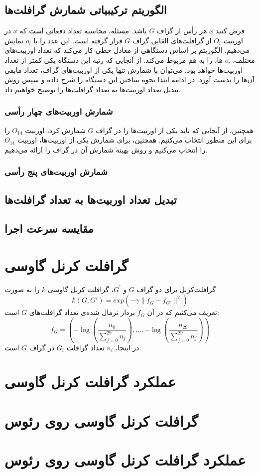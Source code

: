 \subsection{الگوریتم ترکیبیاتی شمارش گرافلت‌ها}
فرض کنید $x$ هر رأس از گراف $G$ باشد. مسئله، محاسبه تعداد دفعاتی است که $x$ در اوربیت $O_i$ از گرافلت‌های القایی گراف $G$ قرار گرفته است. این عدد را با $o_i$ نمایش می‌دهیم. الگوریتم بر اساس دستگاهی از معادل خطی کار می‌کند که تعداد اوربیت‌های مختلف، $o_i$ ها، را به هم مربوط می‌کند. از آنجایی که رتبه این دستگاه یکی کمتر از تعداد اوربیت‌ها خواهد بود، می‌توان با شمارش تنها یکی از اوربیت‌های گراف، تعداد مابقی آن‌ها را بدست آورد. در ادامه ابتدا نحوه ساختن این دستگاه را شرح داده و سپس روش تبدیل تعداد اوربیت‌ها به تعداد گرافلت‌ها را توضیح خواهیم داد.  

\subsubsection{شمارش اوربیت‌های چهار رأسی}
 همچنین، از آنجایی که باید یکی از اوربیت‌ها را در گراف $G$ شمارش کرد، اوربیت $O_14$ را برای این منظور انتخاب می‌کنیم. همچنین، برای شمارش یکی از اوربیت‌ها، اوربیت $O_14$ را انتخاب می‌کنیم و روش بهینه شمارش آن در گراف را ارائه می‌دهیم.

\subsubsection{شمارش اوربیت‌های پنج رأسی}

\subsection{تبدیل تعداد اوربیت‌ها به تعداد گرافلت‌ها}

\subsection{مقایسه سرعت اجرا}

\section{گرافلت کرنل گاوسی}
گرافلت‌کرنل 
برای دو گراف $G$ و $G^\prime$، گرافلت کرنل گاوسی $k$ را به صورت
\begin{equation}
\label{eqn:kernelfunction}
k(G,G') = exp(-\gamma\parallel f_G - f_{G'}\parallel^2)
\end{equation}
تعریف می‌کنیم که در آن $f_G$ بردار نرمال شده‌ی تعداد گرافلت‌های $G$ است:
\begin{equation}
\label{eqn:featurevector}
f_G = (-\log(\dfrac{n_0}{\sum _{j=0}^{29} n_j}),...,-\log(\dfrac{n_{29}}{\sum _{j=0}^{29} n_j}))
\end{equation}
در اینجا، $n_i$ تعداد گرافلت $G_i$ در گراف $G$ است.

\section{عملکرد گرافلت کرنل گاوسی}
\section{گرافلت کرنل گاوسی روی رئوس}
\section{عملکرد گرافلت کرنل گاوسی روی رئوس}